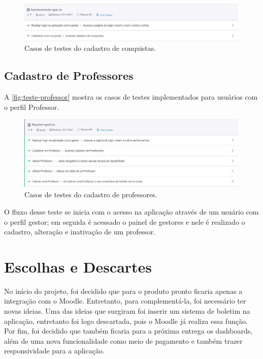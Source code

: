 \documentclass[
    12pt,               %
    openright,          %
    oneside,
    a4paper,            %
    english,            %
    brazil              %
    ]{ifsp-spo-inf-ctds} %
\begin{document}
\begin{figure}[htb]
    \centering
	\includegraphics[width=16cm]{imagens/TesteConquista.JPG}
	\caption{\label{fig:teste-conquista} Casos de testes do cadastro de conquistas.}
\end{figure}

\subsection{Cadastro de Professores}
A \autoref{fig:teste-professor} mostra os casos de testes implementados para usuários com o perfil Professor. 

\begin{figure}[htb]
    \centering
	\includegraphics[width=16cm]{imagens/TesteProfessor.JPG}
	\caption{\label{fig:teste-professor} Casos de testes do cadastro de professores.}
\end{figure}

O fluxo desse teste se inicia com o acesso na aplicação através de um usuário com o perfil gestor; em seguida é acessado o painel de gestores e nele é realizado o cadastro, alteração e inativação de um professor.

  

\section{Escolhas e Descartes}
No início do projeto, foi decidido que para o produto pronto ficaria apenas a integração com o Moodle. Entretanto, para complementá-la, foi necessário ter novas ideias. Uma das ideias que surgiram foi inserir um sistema de boletim na aplicação, entretanto foi logo descartada, pois o Moodle já realiza essa função. Por fim, foi decidido que também ficaria para a próxima entrega os dashboards, além de uma nova funcionalidade como meio de pagamento e também trazer responsividade para a aplicação.  
\end{document}
